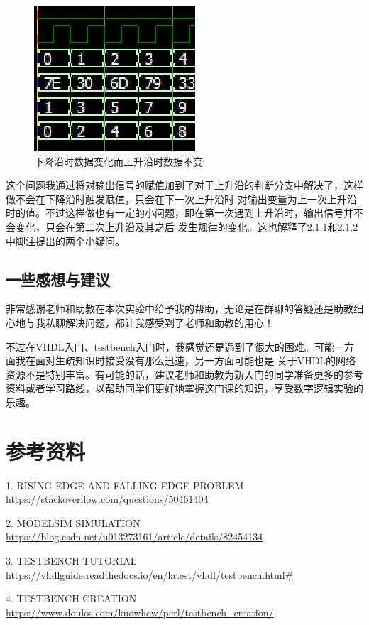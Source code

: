 \documentclass[UTF8]{article}
\begin{document}
\begin{figure}[h]
    \centering
    \includegraphics[]{fallingEdgeUpdate.jpg}
    \caption{下降沿时数据变化而上升沿时数据不变}
\end{figure}
\qquad 这个问题我通过将对输出信号的赋值加到了对于上升沿的判断分支中解决了，这样做不会在下降沿时触发赋值，只会在下一次上升沿时
对输出变量为上一次上升沿时的值。不过这样做也有一定的小问题，即在第一次遇到上升沿时，输出信号并不会变化，只会在第二次上升沿及其之后
发生规律的变化。这也解释了2.1.1和2.1.2中脚注提出的两个小疑问。

\subsection{一些感想与建议}
\qquad 非常感谢老师和助教在本次实验中给予我的帮助，无论是在群聊的答疑还是助教细心地与我私聊解决问题，都让我感受到了老师和助教的用心！

\qquad 不过在VHDL入门、testbench入门时，我感觉还是遇到了很大的困难。可能一方面我在面对生疏知识时接受没有那么迅速，另一方面可能也是
关于VHDL的网络资源不是特别丰富。有可能的话，建议老师和助教为新入门的同学准备更多的参考资料或者学习路线，以帮助同学们更好地掌握这门课的知识，享受数字逻辑实验的乐趣。



\section{参考资料}
1. RISING EDGE AND FALLING EDGE PROBLEM \\\url{https://stackoverflow.com/questions/50461404}


2. MODELSIM SIMULATION \\\url{https://blog.csdn.net/u013273161/article/details/82454134}


3. TESTBENCH TUTORIAL \\\url{https://vhdlguide.readthedocs.io/en/latest/vhdl/testbench.html#}


4. TESTBENCH CREATION \\\url{https://www.doulos.com/knowhow/perl/testbench_creation/}
\end{document}
